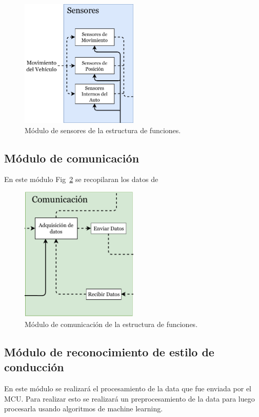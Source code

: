 \begin{figure}[htbp!]
\centering
\includegraphics[width=0.5\textwidth]{sens.pdf}
\caption{Módulo de sensores de la estructura de funciones.}
\label{fig:3.5}
\end{figure}

\subsection{Módulo de comunicación}
En este módulo Fig~\ref{fig:3.6} se recopilaran los datos de

\begin{figure}[htbp!]
\centering
\includegraphics[width=0.5\textwidth]{com.pdf}
\caption{Módulo de comunicación de la estructura de funciones.}
\label{fig:3.6}
\end{figure}


\subsection{Módulo de reconocimiento de estilo de conducción}
En este módulo se realizará el procesamiento de la data que fue enviada por el MCU. Para realizar esto se realizará un preprocesamiento de la data para luego procesarla usando algoritmos de machine learning.

